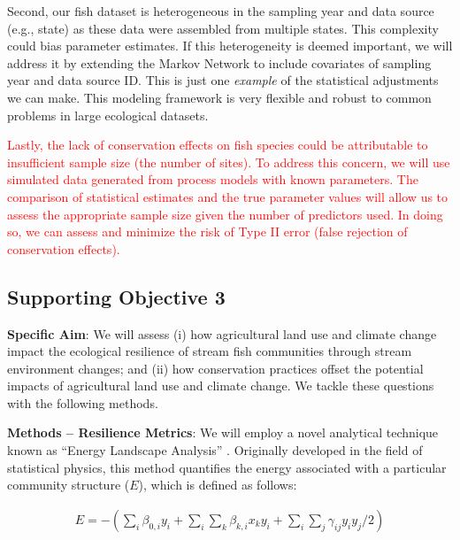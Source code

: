 \documentclass[12pt, class=article, crop=false]{standalone}
\begin{document}
Second, our fish dataset is heterogeneous in the sampling year and data source (e.g., state) as these data were assembled from multiple states.
This complexity could bias parameter estimates.
If this heterogeneity is deemed important, we will address it by extending the Markov Network to include covariates of sampling year and data source ID.
This is just one \textit{example} of the statistical adjustments we can make.
This modeling framework is very flexible and robust to common problems in large ecological datasets.

\textcolor{red}{Lastly, the lack of conservation effects on fish species could be attributable to insufficient sample size (the number of sites).
To address this concern, we will use simulated data generated from process models with known parameters.
The comparison of statistical estimates and the true parameter values will allow us to assess the appropriate sample size given the number of predictors used.
In doing so, we can assess and minimize the risk of Type II error (false rejection of conservation effects).}

\subsection{Supporting Objective 3}

\textbf{Specific Aim}: We will assess (i) how agricultural land use and climate change impact the ecological resilience of stream fish communities through stream environment changes; and (ii) how conservation practices offset the potential impacts of agricultural land use and climate change.
We tackle these questions with the following methods.

\textbf{Methods -- Resilience Metrics}: We will employ a novel analytical technique known as ``Energy Landscape Analysis'' \citep{suzuki_energy_2021}. Originally developed in the field of statistical physics, this method quantifies the energy associated with a particular community structure ($E$), which is defined as follows:

\begin{align}\label{eq:energy}
E = -(\sum_i \beta_{0,i} y_i + \sum_i \sum_k \beta_{k,i} x_{k} y_i + \sum_i \sum_j \gamma_{ij} y_i y_j / 2)
\end{align}
\end{document}
